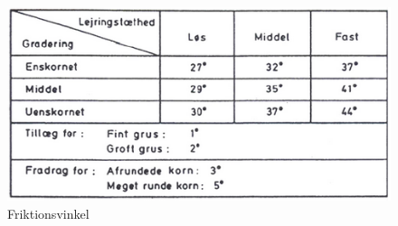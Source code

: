 \begin{figure}[htbp] \centering
	\begin{minipage}[b]{0.48\textwidth}\centering
		\includegraphics[width=1.2\textwidth]{billeder/friktionsvinkel.png}
		\caption{Friktionsvinkel \citep[ s. 170]{geoteknik}}
		\label{fig:friktionsvinkel}
	\end{minipage}\hfill
\end{figure}
